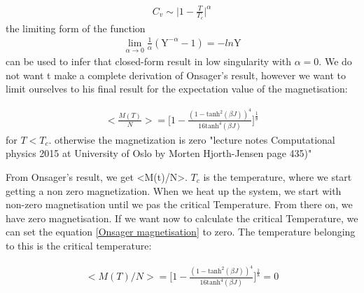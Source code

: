 \documentclass[10pt,a4paper]{article}
\begin{document}
\begin{align}
C_v \sim \Bigg| 1- \frac{T}{T_c}\Bigg|^{\alpha}
\end{align}
the limiting form of the function
\begin{align}
\lim_{\alpha \to 0} \frac{1}{\alpha}(\mathrm{Y}^{-\alpha}-1)=-ln\mathrm{Y}
\end{align}
can be used to infer that closed-form result in low singularity with $\alpha = 0.$
We do not want t make a complete derivation of Onsager's result, however we want to limit ourselves to his final result for the expectation value of the magnetisation:

\begin{align}
<\frac{M(T)}{N}> = \Bigg[ 1- \frac{(1 - \mathrm{tanh} ^2(\beta J))^{4}}{16\mathrm{tanh}^{4}(\beta J)} \Bigg] ^{\frac{1}{8}} \label{Onsager magnetisation}
\end{align}
for $T<T_c.$ otherwise the magnetization is zero 
"lecture notes Computational physics 2015 at University of Oslo by Morten Hjorth-Jensen page 435)" 


From Onsager's result, we get <M(t)/N>. $T_c$ is the temperature, where we start getting a non zero magnetization. When we heat up the system, we start with non-zero magnetisation until we pas the critical Temperature. From there on, we have zero magnetisation.
If we want now to calculate the critical Temperature, we can set the equation \ref{Onsager magnetisation} to zero. The temperature belonging to this is the critical temperature:
   
\begin{align}
<M(T)/N> = \Bigg[ 1- \frac{(1 - \mathrm{tanh} ^2(\beta J))^{4}}{16\mathrm{tanh}^{4}(\beta J)} \Bigg] ^{\frac{1}{8}} = 0
\end{align}
\end{document}
